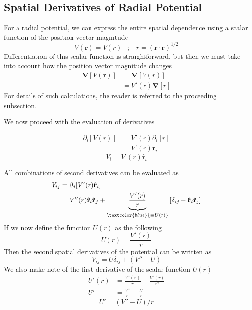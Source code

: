 \documentclass[8pt,a4paper]{article}
\begin{document}
	\subsection{Spatial Derivatives of Radial Potential}
	
	For a radial potential, we can express the entire spatial dependence using a scalar function of the position vector magnitude
	\begin{equation}
		V(\mathbf{r}) = V(r)\;\;\;;\;\;\; r = (\mathbf{r}\cdot\mathbf{r})^{1/2}
	\end{equation}
	Differentiation of this scalar function is straightforward, but then we must take into account how the position vector magnitude changes
	\begin{align}
		\mathbf{\nabla}\left[V(\mathbf{r})\right] &= \mathbf{\nabla}\left[V(r)\right] \nonumber \\
		&= V'(r)\mathbf{\nabla}\left[r\right]
	\end{align}
	For details of such calculations, the reader is referred to the proceeding subsection.
	
	We now proceed with the evaluation of derivatives
	
	\begin{align}
		\partial_i [V(r)] &= V'(r)\partial_i[r] \\
		&= V'(r)\mathbf{\hat{r}}_i
	\end{align}
	\begin{equation}
		\boxed{V_i = V'(r)\mathbf{\hat{r}}_i}
	\end{equation}
	
	All combinations of second derivatives can be evaluated as
	\begin{align}
		V_{ij} &= \partial_j[V'(r)\mathbf{\hat{r}}_i] \\
		&= V''(r)\mathbf{\hat{r}}_i \mathbf{\hat{r}}_j + \underbrace{\frac{V'(r)}{r}}_{\textcolor{blue}{\equiv U(r)}}\left[\delta_{ij} - \mathbf{\hat{r}}_i \mathbf{\hat{r}}_j\right]
	\end{align}
	If we now define the function $U(r)$ as the following
	\begin{equation}
		U(r) = \frac{V'(r)}{r}
	\end{equation}
	Then the second spatial derivatives of the potential can be written as
	\begin{equation}
		\boxed{V_{ij} = U \delta_{ij} +\left(V'' - U\right)}
	\end{equation}
	We also make note of the first derivative of the scalar function $U(r)$
	\begin{align}
		U'(r) &= \frac{V''(r)}{r} - \frac{V'(r)}{r^2} \\
		U'	  &= \frac{V''}{r} - \frac{U}{r}
	\end{align}
	\begin{equation}
		\boxed{U' = (V'' - U)/r}
	\end{equation}
	
\end{document}
